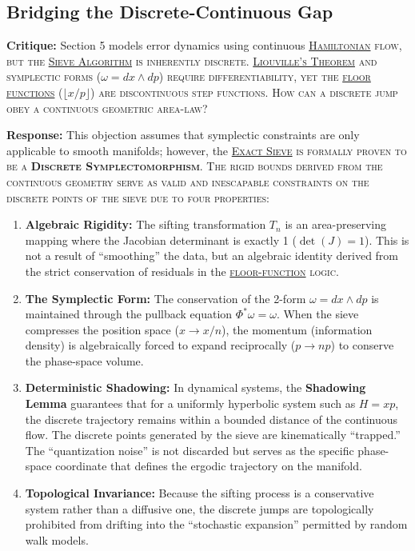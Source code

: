 \documentclass[sn-mathphys-num, pdflatex, referee]{sn-jnl}
\newcommand{\gterm}[2]{\begingroup\normalfont\scshape\hyperlink{#1}{#2}\endgroup}
\begin{document}
\subsection*{Bridging the Discrete-Continuous Gap}
\textbf{Critique:} Section 5 models error dynamics using continuous \gterm{hamiltonian}{Hamiltonian} flow, but the \gterm{exact_sieve}{Sieve Algorithm} is inherently discrete. \gterm{liouville}{Liouville's Theorem} and symplectic forms ($\omega=dx \wedge dp$) require differentiability, yet the \gterm{floor_function}{floor functions} ($\lfloor x/p \rfloor$) are discontinuous step functions. How can a discrete jump obey a continuous geometric area-law?

\textbf{Response:} This objection assumes that symplectic constraints are only applicable to smooth manifolds; however, the \gterm{exact_sieve}{Exact Sieve} is formally proven to be a \textbf{Discrete Symplectomorphism}. The rigid bounds derived from the continuous geometry serve as valid and inescapable constraints on the discrete points of the sieve due to four properties:

\begin{enumerate}
    \item \textbf{Algebraic Rigidity:} The sifting transformation $T_n$ is an area-preserving mapping where the Jacobian determinant is exactly 1 ($\det(J)=1$). This is not a result of ``smoothing'' the data, but an algebraic identity derived from the strict conservation of residuals in the \gterm{floor_function}{floor-function} logic.
    \item \textbf{The Symplectic Form:} The conservation of the 2-form $\omega=dx \wedge dp$ is maintained through the pullback equation $\Phi^*\omega=\omega$. When the sieve compresses the position space ($x \to x/n$), the momentum (information density) is algebraically forced to expand reciprocally ($p \to np$) to conserve the phase-space volume.
    \item \textbf{Deterministic Shadowing:} In dynamical systems, the \textbf{Shadowing Lemma} guarantees that for a uniformly hyperbolic system such as $H=xp$, the discrete trajectory remains within a bounded distance of the continuous flow. The discrete points generated by the sieve are kinematically ``trapped.'' The ``quantization noise'' is not discarded but serves as the specific phase-space coordinate that defines the ergodic trajectory on the manifold.
    \item \textbf{Topological Invariance:} Because the sifting process is a conservative system rather than a diffusive one, the discrete jumps are topologically prohibited from drifting into the ``stochastic expansion'' permitted by random walk models.
\end{enumerate}
\end{document}
